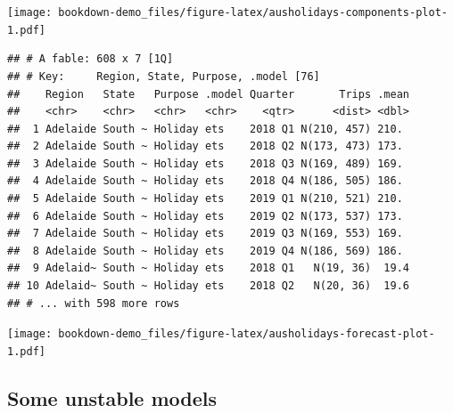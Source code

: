 \documentclass[]{book}
\newenvironment{Shaded}{\begin{snugshade}}{\end{snugshade}}
\newcommand{\KeywordTok}[1]{\textcolor[rgb]{0.13,0.29,0.53}{\textbf{#1}}}
\newcommand{\NormalTok}[1]{#1}
\newcommand{\OperatorTok}[1]{\textcolor[rgb]{0.81,0.36,0.00}{\textbf{#1}}}
\newcommand{\StringTok}[1]{\textcolor[rgb]{0.31,0.60,0.02}{#1}}
\begin{document}
\texttt{[image: bookdown-demo\_files/figure-latex/ausholidays-components-plot-1.pdf]}

\begin{Shaded}
\end{Shaded}

\begin{verbatim}
## # A fable: 608 x 7 [1Q]
## # Key:     Region, State, Purpose, .model [76]
##    Region   State   Purpose .model Quarter       Trips .mean
##    <chr>    <chr>   <chr>   <chr>    <qtr>      <dist> <dbl>
##  1 Adelaide South ~ Holiday ets    2018 Q1 N(210, 457) 210. 
##  2 Adelaide South ~ Holiday ets    2018 Q2 N(173, 473) 173. 
##  3 Adelaide South ~ Holiday ets    2018 Q3 N(169, 489) 169. 
##  4 Adelaide South ~ Holiday ets    2018 Q4 N(186, 505) 186. 
##  5 Adelaide South ~ Holiday ets    2019 Q1 N(210, 521) 210. 
##  6 Adelaide South ~ Holiday ets    2019 Q2 N(173, 537) 173. 
##  7 Adelaide South ~ Holiday ets    2019 Q3 N(169, 553) 169. 
##  8 Adelaide South ~ Holiday ets    2019 Q4 N(186, 569) 186. 
##  9 Adelaid~ South ~ Holiday ets    2018 Q1   N(19, 36)  19.4
## 10 Adelaid~ South ~ Holiday ets    2018 Q2   N(20, 36)  19.6
## # ... with 598 more rows
\end{verbatim}

\begin{Shaded}
\end{Shaded}

\texttt{[image: bookdown-demo\_files/figure-latex/ausholidays-forecast-plot-1.pdf]}

\hypertarget{some-unstable-models}{%
\subsection{Some unstable models}\label{some-unstable-models}}
\end{document}

